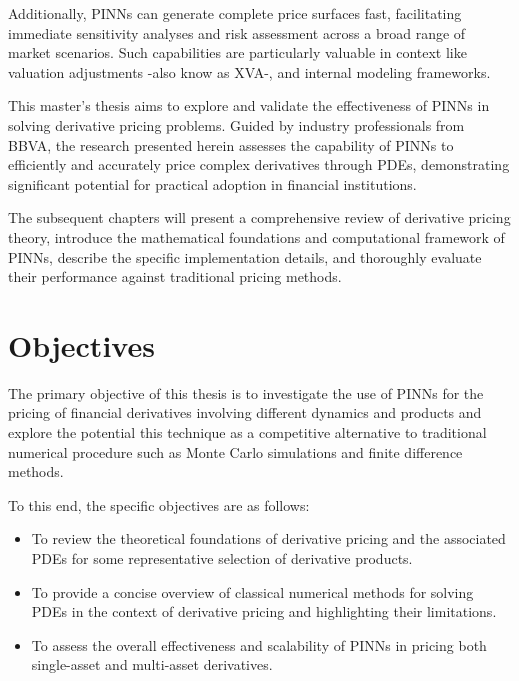 \documentclass[12pt]{report} %
\theoremstyle{plain}           %
\theoremstyle{definition}      %
\theoremstyle{remark}          %
\begin{document}
Additionally, PINNs can generate complete price surfaces fast, facilitating immediate 
sensitivity analyses and risk assessment across a broad range of market scenarios. Such 
capabilities are particularly valuable in context like valuation adjustments -also know as XVA-, and internal modeling frameworks.

This master's thesis aims to explore and validate the effectiveness of PINNs in solving 
derivative pricing problems. Guided by industry professionals from BBVA, 
the research presented herein assesses the capability of PINNs to efficiently and accurately 
price complex derivatives through PDEs, demonstrating significant potential 
for practical adoption in financial institutions.

The subsequent chapters will present a comprehensive review of derivative pricing theory, 
introduce the mathematical foundations and computational framework of PINNs, describe the 
specific implementation details, and thoroughly evaluate their performance against traditional pricing methods.

\section{Objectives}

The primary objective of this thesis is to investigate the use of PINNs for the pricing of financial 
derivatives involving different dynamics and products and explore the potential this technique
as a competitive alternative to traditional numerical procedure such as Monte Carlo simulations and finite difference methods.

To this end, the specific objectives are as follows:
\begin{itemize}
    \item To review the theoretical foundations of derivative pricing and the associated PDEs for some representative selection of derivative products.
    \item To provide a concise overview of classical numerical methods for solving PDEs in the context of derivative pricing and highlighting their limitations.
    \item To assess the overall effectiveness and scalability of PINNs in pricing both single-asset and multi-asset derivatives.
\end{itemize}
\end{document}
